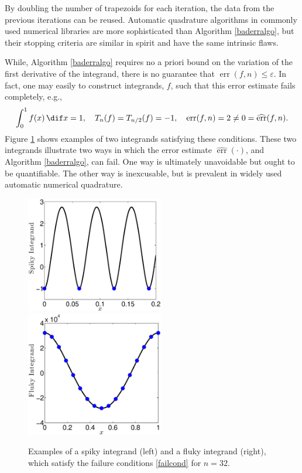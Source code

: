 \documentclass[]{amsart}
\DeclareMathOperator{\err}{err}
\newcommand{\herr}{\widehat{\err}}
\theoremstyle{definition}
\theoremstyle{remark}
\begin{document}
By doubling the number of trapezoids for each iteration, the data from the previous iterations can be reused.  Automatic quadrature algorithms in commonly used numerical libraries are more sophisticated than Algorithm \ref{baderralgo}, but their stopping criteria are similar in spirit and have the same intrinsic flaws.

While, Algorithm \ref{baderralgo} requires no a priori bound on the variation of the first derivative of the integrand, there is no guarantee that $\err(f,n)\le \varepsilon$.  In fact, one may easily to construct integrands, $f$, such that this error estimate fails completely, e.g.,
\begin{equation} \label{failcond}
\int_0^1 f(x) \, \dif x =  1, \quad T_{n}(f)=T_{n/2}(f) = -1, \quad \err(f,n)=2 \ne 0 = \herr(f,n).
\end{equation}
Figure \ref{spikeflukefig} shows  examples of two integrands satisfying these conditions. These two integrands illustrate two ways in which the error estimate $\herr(\cdot)$, and Algorithm \ref{baderralgo}, can fail.  One way is ultimately unavoidable but ought to be quantifiable.  The other way is inexcusable, but is prevalent in widely used automatic numerical quadrature.

\begin{figure}
\centering 
\includegraphics[width=6cm]{SpikyIntegFigcolor.eps} \quad
\includegraphics[width=6cm]{FlukyIntegFigcolor.eps}
\caption{Examples of a spiky integrand (left) and a fluky integrand (right), which satisfy the failure conditions \eqref{failcond} for $n=32$. \label{spikeflukefig}}
\end{figure}
\end{document}
